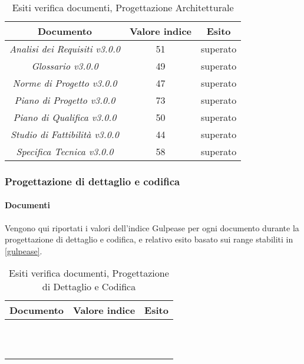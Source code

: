 	\begin{table}[H]
	\centering
	\begin{tabular}{ | c | c | c | }
    \hline
    Documento & Valore indice & Esito \\ \hline
    \emph{Analisi dei Requisiti v3.0.0} & 51 &  superato \\ \hline
    \emph{Glossario v3.0.0} & 49 &  superato \\ \hline
    \emph{Norme di Progetto v3.0.0} & 47 &  superato \\ \hline
    \emph{Piano di Progetto v3.0.0} & 73 &  superato \\ \hline
    \emph{Piano di Qualifica v3.0.0} & 50 &  superato \\ \hline
    \emph{Studio di Fattibilità v3.0.0} & 44 &  superato \\ \hline
    \emph{Specifica Tecnica v3.0.0} & 58 & superato \\ \hline
    \end{tabular}
	\caption{Esiti verifica documenti, Progettazione Architetturale}
	\end{table}
	

	\subsubsection{Progettazione di dettaglio e codifica}
	\paragraph{Documenti}
	 Vengono qui riportati i valori dell’indice Gulpease per ogni documento durante la progettazione di dettaglio e codifica, e relativo esito basato sui range stabiliti in \ref{gulpease}.
	
	\begin{table}[H]
	\centering
	\begin{tabular}{ | c | c | c | }
    \hline
    Documento & Valore indice & Esito \\ \hline
    \AnalisiDeiRequisiti{} &  &   \\ \hline
    \DefinizioneDiProdotto{} &  &   \\ \hline
    \Glossario{} &  &   \\ \hline
    \ManualeAdmin{} &  &   \\ \hline
    \ManualeSviluppatore{} &  &   \\ \hline
    \ManualeUtente{} &  &   \\ \hline
    \NormeDiProgetto{} &  &   \\ \hline
    \PianoDiProgetto{} &  &   \\ \hline
    \PianoDiQualifica{} &  &   \\ \hline
    \SpecificaTecnica{} &  &  \\ \hline
    \StudioDiFattibilita{} &  &   \\ \hline
    \end{tabular}
	\caption{Esiti verifica documenti, Progettazione di Dettaglio e Codifica}
	\end{table}
	
